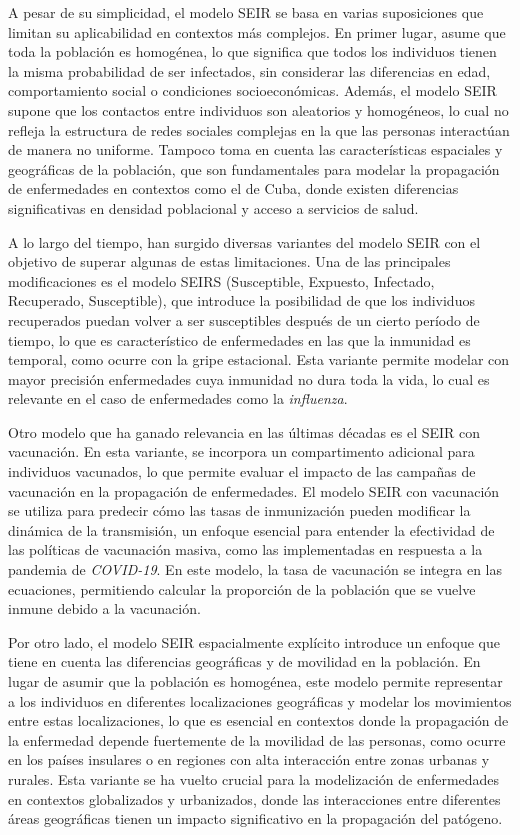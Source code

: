 A pesar de su simplicidad, el modelo SEIR se basa en varias suposiciones que limitan su aplicabilidad en contextos más complejos. En primer lugar, asume que toda la población es homogénea, lo que significa que todos los individuos tienen la misma probabilidad de ser infectados, sin considerar las diferencias en edad, comportamiento social o condiciones socioeconómicas. Además, el modelo SEIR supone que los contactos entre individuos son aleatorios y homogéneos, lo cual no refleja la estructura de redes sociales complejas en la que las personas interactúan de manera no uniforme. Tampoco toma en cuenta las características espaciales y geográficas de la población, que son fundamentales para modelar la propagación de enfermedades en contextos como el de Cuba, donde existen diferencias significativas en densidad poblacional y acceso a servicios de salud.

A lo largo del tiempo, han surgido diversas variantes del modelo SEIR con el objetivo de superar algunas de estas limitaciones. Una de las principales modificaciones es el modelo SEIRS (Susceptible, Expuesto, Infectado, Recuperado, Susceptible), que introduce la posibilidad de que los individuos recuperados puedan volver a ser susceptibles después de un cierto período de tiempo, lo que es característico de enfermedades en las que la inmunidad es temporal, como ocurre con la gripe estacional. Esta variante permite modelar con mayor precisión enfermedades cuya inmunidad no dura toda la vida, lo cual es relevante en el caso de enfermedades como la \textit{influenza}.

Otro modelo que ha ganado relevancia en las últimas décadas es el SEIR con vacunación. En esta variante, se incorpora un compartimento adicional para individuos vacunados, lo que permite evaluar el impacto de las campañas de vacunación en la propagación de enfermedades. El modelo SEIR con vacunación se utiliza para predecir cómo las tasas de inmunización pueden modificar la dinámica de la transmisión, un enfoque esencial para entender la efectividad de las políticas de vacunación masiva, como las implementadas en respuesta a la pandemia de \textit{COVID-19}. En este modelo, la tasa de vacunación se integra en las ecuaciones, permitiendo calcular la proporción de la población que se vuelve inmune debido a la vacunación.

Por otro lado, el modelo SEIR espacialmente explícito introduce un enfoque que tiene en cuenta las diferencias geográficas y de movilidad en la población. En lugar de asumir que la población es homogénea, este modelo permite representar a los individuos en diferentes localizaciones geográficas y modelar los movimientos entre estas localizaciones, lo que es esencial en contextos donde la propagación de la enfermedad depende fuertemente de la movilidad de las personas, como ocurre en los países insulares o en regiones con alta interacción entre zonas urbanas y rurales. Esta variante se ha vuelto crucial para la modelización de enfermedades en contextos globalizados y urbanizados, donde las interacciones entre diferentes áreas geográficas tienen un impacto significativo en la propagación del patógeno.

